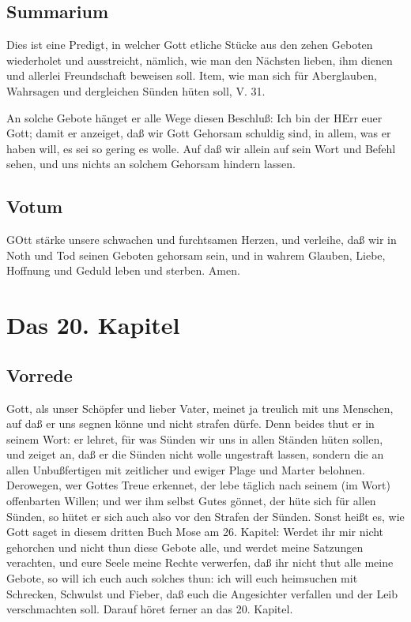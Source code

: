 \section{Summarium}

Dies ist eine Predigt, in welcher Gott etliche Stücke aus den zehen Geboten wiederholet und ausstreicht, nämlich, wie man den Nächsten lieben, ihm dienen und allerlei Freundschaft beweisen soll. Item, wie man sich für Aberglauben, Wahrsagen und dergleichen Sünden hüten soll, V. 31.

An solche Gebote hänget er alle Wege diesen Beschluß: Ich bin der HErr euer Gott; damit er anzeiget, daß wir Gott Gehorsam schuldig sind, in allem, was er haben will, es sei so gering es wolle. Auf daß wir allein auf sein Wort und Befehl sehen, und uns nichts an solchem Gehorsam hindern lassen.

\section{Votum}

GOtt stärke unsere schwachen und furchtsamen Herzen, und verleihe, daß wir in Noth und Tod seinen Geboten gehorsam sein, und in wahrem Glauben, Liebe, Hoffnung und Geduld leben und sterben. Amen.

\chapter{Das 20. Kapitel}

\section{Vorrede}

Gott, als unser Schöpfer und lieber Vater, meinet ja treulich mit uns Menschen, auf daß er uns segnen könne und nicht strafen dürfe. Denn beides thut er in seinem Wort: er lehret, für was Sünden wir uns in allen Ständen hüten sollen, und zeiget an, daß er die Sünden nicht wolle ungestraft lassen, sondern die an allen Unbußfertigen mit zeitlicher und ewiger Plage und Marter belohnen. Derowegen, wer Gottes Treue erkennet, der lebe täglich nach seinem (im Wort) offenbarten Willen; und wer ihm selbst Gutes gönnet, der hüte sich für allen Sünden, so hütet er sich auch also vor den Strafen der Sünden. Sonst heißt es, wie Gott saget in diesem dritten Buch Mose am 26. Kapitel: Werdet ihr mir nicht gehorchen und nicht thun diese Gebote alle, und werdet meine Satzungen verachten, und eure Seele meine Rechte verwerfen, daß ihr nicht thut alle meine Gebote, so will ich euch auch solches thun: ich will euch heimsuchen mit Schrecken, Schwulst und Fieber, daß euch die Angesichter verfallen und der Leib verschmachten soll. Darauf höret ferner an das 20. Kapitel.

